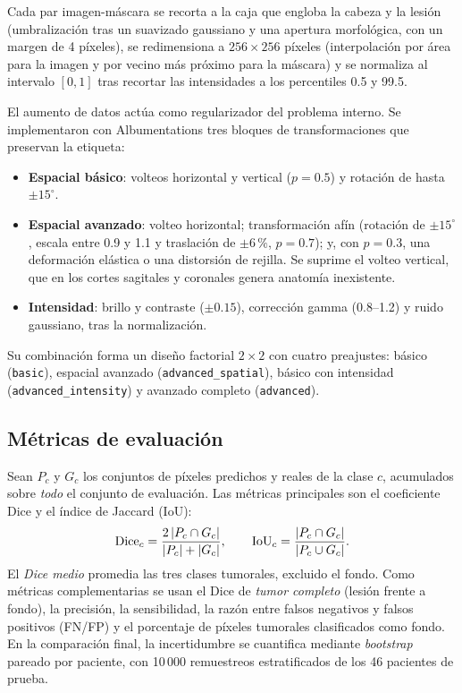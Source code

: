 Cada par imagen-máscara se recorta a la caja que engloba la cabeza y la lesión (umbralización tras un suavizado gaussiano y una apertura morfológica, con un margen de 4 píxeles), se redimensiona a $256\times256$ píxeles (interpolación por área para la imagen y por vecino más próximo para la máscara) y se normaliza al intervalo $[0,1]$ tras recortar las intensidades a los percentiles 0.5 y 99.5.

\label{subsec:aumento}El aumento de datos actúa como regularizador del problema interno. Se implementaron con Albumentations tres bloques de transformaciones que preservan la etiqueta:

\begin{itemize}
  \item \textbf{Espacial básico}: volteos horizontal y vertical ($p=0.5$) y rotación de hasta $\pm15^\circ$.
  \item \textbf{Espacial avanzado}: volteo horizontal; transformación afín (rotación de $\pm15^\circ$, escala entre 0.9 y 1.1 y traslación de $\pm6\,\%$, $p=0.7$); y, con $p=0.3$, una deformación elástica o una distorsión de rejilla. Se suprime el volteo vertical, que en los cortes sagitales y coronales genera anatomía inexistente.
  \item \textbf{Intensidad}: brillo y contraste ($\pm0.15$), corrección gamma (0.8--1.2) y ruido gaussiano, tras la normalización.
\end{itemize}

Su combinación forma un diseño factorial $2\times2$ con cuatro preajustes: básico (\texttt{basic}), espacial avanzado (\texttt{advanced\_spatial}), básico con intensidad (\texttt{advanced\_intensity}) y avanzado completo (\texttt{advanced}).

\subsection{Métricas de evaluación}\label{subsec:metricas}

Sean $P_c$ y $G_c$ los conjuntos de píxeles predichos y reales de la clase $c$, acumulados sobre \emph{todo} el conjunto de evaluación. Las métricas principales son el coeficiente Dice y el índice de Jaccard (IoU):
\begin{equation}\label{eq:dice}
  \operatorname{Dice}_c = \frac{2\,|P_c \cap G_c|}{|P_c| + |G_c|},
  \qquad
  \operatorname{IoU}_c = \frac{|P_c \cap G_c|}{|P_c \cup G_c|}.
\end{equation}
El \emph{Dice medio} promedia las tres clases tumorales, excluido el fondo. Como métricas complementarias se usan el Dice de \emph{tumor completo} (lesión frente a fondo), la precisión, la sensibilidad, la razón entre falsos negativos y falsos positivos (FN/FP) y el porcentaje de píxeles tumorales clasificados como fondo. En la comparación final, la incertidumbre se cuantifica mediante \emph{bootstrap} pareado por paciente, con 10\,000 remuestreos estratificados de los 46 pacientes de prueba.

